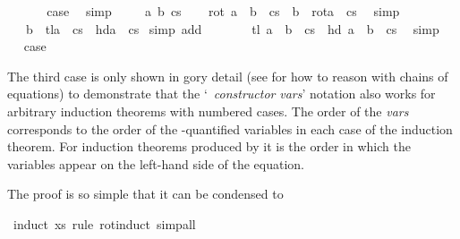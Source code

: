 \begin{isabellebody}
\isanewline
\ \ \isamarkupfalse%
\ {}\ \isamarkupfalse%
\ {\isacharquery}case\ \isamarkupfalse%
\ simp\isanewline
\isamarkupfalse%
\isanewline
\ \ \isamarkupfalse%
\ {\isacharparenleft}{}\ a\ b\ cs{\isacharparenright}\isanewline
\ \ \isamarkupfalse%
\ {\isachardoublequote}rot\ {\isacharparenleft}a\ {\isacharhash}\ b\ {\isacharhash}\ cs{\isacharparenright}\ {\isacharequal}\ b\ {\isacharhash}\ rot{\isacharparenleft}a\ {\isacharhash}\ cs{\isacharparenright}{\isachardoublequote}\ \isamarkupfalse%
\ simp\isanewline
\ \ \isamarkupfalse%
\ \isamarkupfalse%
\ {\isachardoublequote}{\isasymdots}\ {\isacharequal}\ b\ {\isacharhash}\ tl{\isacharparenleft}a\ {\isacharhash}\ cs{\isacharparenright}\ {\isacharat}\ {\isacharbrackleft}hd{\isacharparenleft}a\ {\isacharhash}\ cs{\isacharparenright}{\isacharbrackright}{\isachardoublequote}\ \isamarkupfalse%
simp\ add{\isacharcolon}{}{\isacharparenright}\isanewline
\ \ \isamarkupfalse%
\ \isamarkupfalse%
\ {\isachardoublequote}{\isasymdots}\ {\isacharequal}\ tl\ {\isacharparenleft}a\ {\isacharhash}\ b\ {\isacharhash}\ cs{\isacharparenright}\ {\isacharat}\ {\isacharbrackleft}hd\ {\isacharparenleft}a\ {\isacharhash}\ b\ {\isacharhash}\ cs{\isacharparenright}{\isacharbrackright}{\isachardoublequote}\ \isamarkupfalse%
\ simp\isanewline
\ \ \isamarkupfalse%
\ \isamarkupfalse%
\ {\isacharquery}case\ \isamarkupfalse%
\isacommand{{\isachardot}}\isanewline
\isamarkupfalse%
\isamarkupfalse%
%
\begin{isamarkuptext}%
\noindent
The third case is only shown in gory detail (see \cite{BauerW-TPHOLs01}
for how to reason with chains of equations) to demonstrate that the
`~\isa{(}\emph{constructor} \emph{vars}\isa{)}' notation also
works for arbitrary induction theorems with numbered cases. The order
of the \emph{vars} corresponds to the order of the
\isa{{\isasymAnd}}-quantified variables in each case of the induction
theorem. For induction theorems produced by  it is
the order in which the variables appear on the left-hand side of the
equation.

The proof is so simple that it can be condensed to%
\end{isamarkuptext}%
\isamarkuptrue%
\isamarkupfalse%
\ {\isacharparenleft}induct\ xs\ rule{\isacharcolon}\ rot{\isachardot}induct{\isacharcomma}\ simp{\isacharunderscore}all{\isacharparenright}\isanewline
\isamarkupfalse%
\isamarkupfalse%
\end{isabellebody}%

